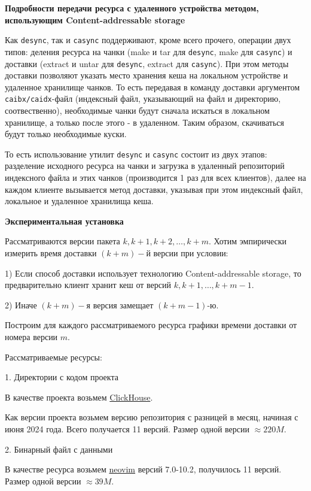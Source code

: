 \documentclass[12pt]{article}
\begin{document}
\begin{center}
\textbf{Подробности передачи ресурса с удаленного устройства методом, использующим Content-addressable storage}
\end{center}

Как \texttt{desync}, так и \texttt{casync} поддерживают, кроме всего прочего, операции двух типов: деления ресурса на чанки (make и tar для \texttt{desync}, make для \texttt{casync}) и доставки (extract и untar для \texttt{desync}, extract для \texttt{casync}). При этом методы доставки позволяют указать место хранения кеша на локальном устройстве и удаленное хранилище чанков. То есть передавая в команду доставки аргументом \texttt{caibx/caidx}-файл (индексный файл, указывающий на файл и директорию, соотвественно), необходимые чанки будут сначала искаться в локальном хранилище, а только после этого - в удаленном. Таким образом, скачиваться будут только необходимые куски.

То есть использование утилит \texttt{desync} и \texttt{casync} состоит из двух этапов: разделение исходного ресурса на чанки и загрузка в удаленный репозиторий индексного файла и этих чанков (производится 1 раз для всех клиентов), далее на каждом клиенте вызывается метод доставки, указывая при этом индексный файл, локальное и удаленное хранилища кеша.

\begin{center}
\textbf{Экспериментальная установка}
\end{center}

Рассматриваются версии пакета $k, k + 1, k + 2, \dots, k + m$. Хотим эмпирически измерить время доставки $(k + m)-$й версии при условии:

1) Если способ доставки использует технологию Content-addressable storage, то предварительно клиент хранит кеш от версий $k, k + 1, \dots, k + m - 1$.

2) Иначе $(k + m)-$я версия замещает $(k + m - 1)$-ю.

Построим для каждого рассматриваемого ресурса графики времени доставки от номера версии $m$.

Рассматриваемые ресурсы:

1. Директории с кодом проекта

В качестве проекта возьмем \href{https://github.com/ClickHouse/ClickHouse}{ClickHouse}.

Как версии проекта возьмем версию репозитория с разницей в месяц, начиная с  июня 2024 года. Всего получается 11 версий. Размер одной версии $\approx 220M$.

2. Бинарный файл с данными 


В качестве ресурса возьмем \href{https://github.com/neovim/neovim/}{neovim} версий 7.0-10.2, получилось 11 версий. Размер одной версии $\approx 39M$.
\end{document}
